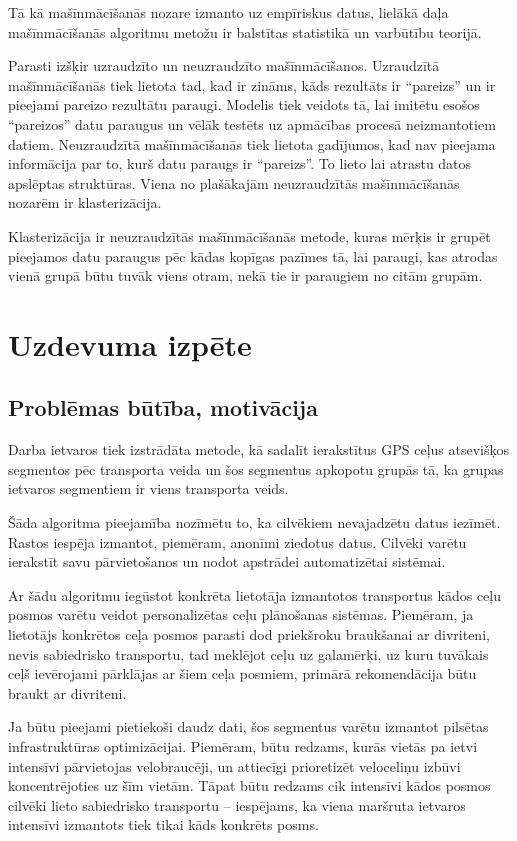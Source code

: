 \documentclass{ludis}
\begin{document}
Tā kā mašīnmācīšanās nozare izmanto uz empīriskus datus, lielākā daļa mašīnmācīšanās
algoritmu metožu ir balstītas statistikā un varbūtību teorijā. 

Parasti izšķir uzraudzīto un neuzraudzīto mašīnmācīšanos. Uzraudzītā mašīnmācīšanās tiek lietota
tad, kad ir zināms, kāds rezultāts ir ``pareizs'' un ir pieejami pareizo rezultātu paraugi.
Modelis tiek veidots tā, lai imitētu esošos ``pareizos'' datu paraugus un vēlāk testēts uz 
apmācības procesā neizmantotiem datiem. Neuzraudzītā mašīnmācīšanās tiek lietota gadī\-jumos, kad
nav pieejama informācija par to, kurš datu paraugs ir ``pareizs''. To lieto lai atrastu datos
apslēptas struktūras. Viena no plašākajām neuzraudzītās mašīnmācīšanās nozarēm 
ir \linebreak klasterizācija.

Klasterizācija ir neuzraudzītās mašīnmācīšanās metode, kuras mērķis ir grupēt pieejamos datu
paraugus pēc kādas kopīgas pazīmes tā, lai paraugi, kas atrodas vienā grupā būtu tuvāk viens otram,
nekā tie ir paraugiem no citām grupām. 

\chapter{Uzdevuma izpēte}
\section{Problēmas būtība, motivācija}
Darba ietvaros tiek izstrādāta metode, kā sadalīt ierakstītus GPS ceļus atsevišķos segmentos
pēc transporta veida un šos segmentus apkopotu grupās tā, ka grupas ietvaros segmentiem ir viens
transporta veids.

Šāda algoritma pieejamība nozīmētu to, ka cilvēkiem nevajadzētu datus iezīmēt. Rastos iespēja
izmantot, piemēram, anonīmi ziedotus datus. Cilvēki varētu ierakstīt savu pārvietošanos
un nodot apstrādei automatizētai sistēmai.

Ar šādu algoritmu iegūstot konkrēta lietotāja izmantotos transportus kādos ceļu posmos varētu veidot
personalizētas ceļu plānošanas sistēmas. Piemēram, ja lietotājs konkrētos ceļa posmos parasti
dod priekšroku braukšanai ar divriteni, nevis sabiedrisko transportu, tad \linebreak meklējot
 ceļu uz galamērķi,
uz kuru tuvākais ceļš ievērojami pārklājas ar šiem ceļa posmiem, primārā rekomendācija būtu
braukt ar divriteni.

Ja būtu pieejami pietiekoši daudz dati, šos segmentus varētu izmantot pilsētas infrastruk\-tūras
optimizācijai. Piemēram, būtu redzams, kurās vietās pa ietvi intensīvi pārvietojas velo\-braucēji,
un attiecīgi prioretizēt veloceliņu izbūvi koncentrējoties uz šīm vietām. Tāpat būtu redzams cik
intensīvi kādos posmos cilvēki lieto sabiedrisko transportu -- iespējams, ka viena maršruta ietvaros
intensīvi izmantots tiek tikai kāds konkrēts posms.
\end{document}
